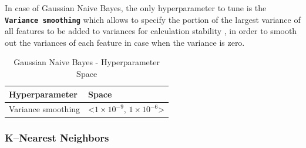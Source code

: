 In case of Gaussian Naive Bayes, the only hyperparameter to tune is the \textbf{\texttt{Variance smoothing}} which allows to specify the portion of the largest variance of all features to be added to variances for calculation stability \citep{scikit-gnb}, in order to smooth out the variances of each feature in case when the variance is zero.
\begin{table}[H]
\small
\setlength{\tabcolsep}{8pt}
\renewcommand{\arraystretch}{1.3}
\centering
    \caption[Gaussian Naive Bayes - Hyperparameter Space]{Gaussian Naive Bayes  - Hyperparameter Space}\label{tab:gnbspace}
    \begin{tabular}{ll}
\toprule
\textbf{Hyperparameter} & \textbf{Space}\\
\midrule
\hline
Variance smoothing & <$1\times 10^{-9}$, $1\times 10^{-6}$> \\
\hline
\bottomrule
\end{tabular}
\vspace{0.7em}

\vspace{-1em}
\end{table}


\subsubsection{K--Nearest Neighbors}

